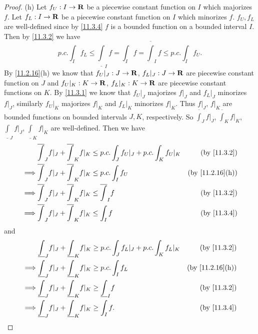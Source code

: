 \begin{proof}{(h)}
  Let \(f_U : I \to \mathbf{R}\) be a piecewise constant function on \(I\) which majorizes \(f\).
  Let \(f_L : I \to \mathbf{R}\) be a piecewise constant function on \(I\) which minorizes \(f\).
  \(f_U, f_L\) are well-defined since by \cref{11.3.4} \(f\) is a bounded function on a bounded interval \(I\).
  Then by \cref{11.3.2} we have
  \[
    p.c. \int_I f_L \leq \underline{\int}_I f = \int_I f = \overline{\int}_I f \leq p.c. \int_I f_U.
  \]
  By \cref{11.2.16}(h) we know that \(f_U|_J : J \to \mathbf{R}\), \(f_L|_J : J \to \mathbf{R}\) are piecewise constant function on \(J\) and \(f_U|_K : K \to \mathbf{R}\), \(f_L|_K : K \to \mathbf{R}\) are piecewise constant functions on \(K\).
  By \cref{11.3.1} we know that \(f_U|_J\) majorizes \(f|_J\) and \(f_L|_J\) minorizes \(f|_J\), similarly \(f_U|_K\) majorizes \(f|_K\) and \(f_L|_K\) minorizes \(f|_K\).
  Thus \(f|_J\), \(f|_K\) are bounded functions on bounded intervals \(J, K\), respectively.
  So \(\overline{\int}_J f|_J\), \(\overline{\int}_K f|_K\), \(\underline{\int}_J f|_J\), \(\underline{\int}_K f|_K\) are well-defined.
  Then we have
  \begin{align*}
             & \overline{\int}_J f|_J + \overline{\int}_K f|_K \leq p.c. \int_J f_U|_J + p.c. \int_K f_U|_K & \text{(by \cref{11.3.2})}     \\
    \implies & \overline{\int}_J f|_J + \overline{\int}_K f|_K \leq p.c. \int_I f_U                         & \text{(by \cref{11.2.16}(h))} \\
    \implies & \overline{\int}_J f|_J + \overline{\int}_K f|_K \leq \overline{\int}_I f                     & \text{(by \cref{11.3.2})}     \\
    \implies & \overline{\int}_J f|_J + \overline{\int}_K f|_K \leq \int_I f                                & \text{(by \cref{11.3.4})}
  \end{align*}
  and
  \begin{align*}
             & \underline{\int}_J f|_J + \underline{\int}_K f|_K \geq p.c. \int_J f_L|_J + p.c. \int_K f_L|_K & \text{(by \cref{11.3.2})}     \\
    \implies & \underline{\int}_J f|_J + \underline{\int}_K f|_K \geq p.c. \int_I f_L                         & \text{(by \cref{11.2.16}(h))} \\
    \implies & \underline{\int}_J f|_J + \underline{\int}_K f|_K \geq \underline{\int}_I f                    & \text{(by \cref{11.3.2})}     \\
    \implies & \underline{\int}_J f|_J + \underline{\int}_K f|_K \geq \int_I f.                               & \text{(by \cref{11.3.4})}

\end{align*}
\end{proof}
